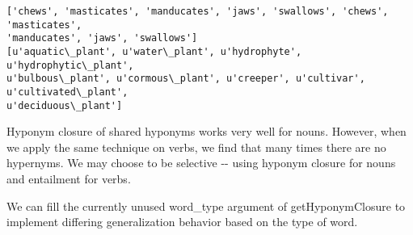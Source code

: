 \documentclass[11pt]{article}
\begin{document}
    \begin{Verbatim}[commandchars=\\\{\},fontsize=\footnotesize]
['chews', 'masticates', 'manducates', 'jaws', 'swallows', 'chews', 'masticates',
'manducates', 'jaws', 'swallows']
[u'aquatic\_plant', u'water\_plant', u'hydrophyte', u'hydrophytic\_plant',
u'bulbous\_plant', u'cormous\_plant', u'creeper', u'cultivar', u'cultivated\_plant',
u'deciduous\_plant']

    \end{Verbatim}

    Hyponym closure of shared hyponyms works very well for nouns. However,
when we apply the same technique on verbs, we find that many times there
are no hypernyms. We may choose to be selective -\/- using hyponym
closure for nouns and entailment for verbs.

We can fill the currently unused word\_type argument of
getHyponymClosure to implement differing generalization behavior based
on the type of word.
\end{document}
